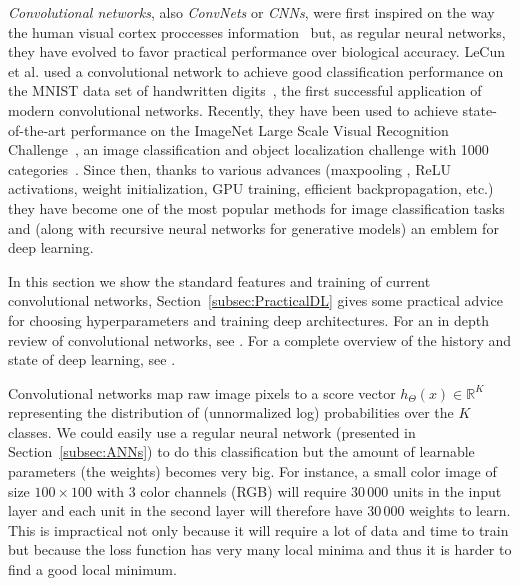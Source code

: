 \emph{Convolutional networks}, also \emph{ConvNets} or \emph{CNNs}, were first inspired on the way the human visual cortex proccesses information~\cite{Fukushima1980} but, as regular neural networks, they have evolved to favor practical performance over biological accuracy. LeCun et al. used a convolutional network to achieve good classification performance on the MNIST data set of handwritten digits~\cite{LeCun1989, LeCun1998}, the first successful application of modern convolutional networks. Recently, they have been used to achieve state-of-the-art performance on the ImageNet Large Scale Visual Recognition Challenge~\cite{Krizhevsky2012}, an image classification and object localization challenge with 1000 categories~\cite{Russakovsky2014}. Since then, thanks to various advances (maxpooling , ReLU activations, weight initialization, GPU training, efficient backpropagation, etc.) they have become one of the most popular methods for image classification tasks and (along with recursive neural networks for generative models) an emblem for deep learning.

In this section we show the standard features and training of current convolutional networks, Section~\ref{subsec:PracticalDL} gives some practical advice for choosing hyperparameters and training deep architectures. For an in depth review of convolutional networks, see \cite{Karpathy2015}. For a complete overview of the history and state of deep learning, see \cite{Schmidhuber2015}.

Convolutional networks map raw image pixels to a score vector $h_\Theta(x) \in \mathbb{R}^K$ representing the distribution of (unnormalized log) probabilities over the $K$ classes. We could easily use a regular neural network (presented in Section~\ref{subsec:ANNs}) to do this classification but the amount of learnable parameters (the weights) becomes very big. For instance, a small color image of size $100\times100$ with 3 color channels (RGB) will require $30\,000$ units in the input layer and each unit in the second layer will therefore have $30\,000$ weights to learn. This is impractical not only because it will require a lot of data and time to train but because the loss function has very many local minima and thus it is harder to find a good local minimum.

